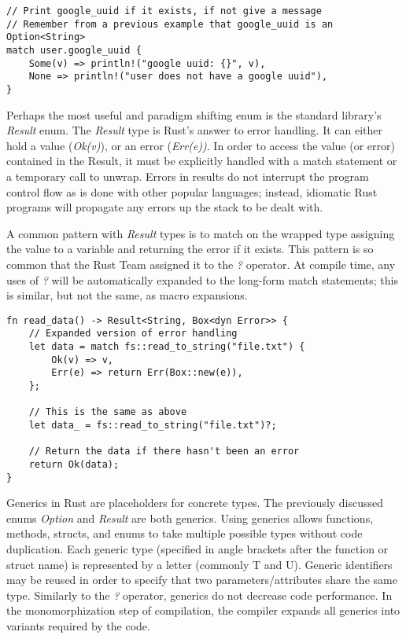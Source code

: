 \documentclass[12pt]{article}
\begin{document}
\begin{flushleft}
\singlespacing{}
\begin{verbatim}
// Print google_uuid if it exists, if not give a message
// Remember from a previous example that google_uuid is an Option<String>
match user.google_uuid {
    Some(v) => println!("google uuid: {}", v),
    None => println!("user does not have a google uuid"),
}
\end{verbatim}
\doublespacing{}

Perhaps the most useful and paradigm shifting enum is the standard library's
\textit{Result} enum. The \textit{Result} type is Rust's answer to error
handling. It can either hold a value (\textit{Ok(v)}), or an error
(\textit{Err(e))}. In order to access the value (or error) contained in the
Result, it must be explicitly handled with a match statement or a temporary call
to unwrap. Errors in results do not interrupt the program control flow as is
done with other popular languages; instead, idiomatic Rust programs will propagate
any errors up the stack to be dealt with.

A common pattern with \textit{Result} types is to match on the wrapped type
assigning the value to a variable and returning the error if it exists. This
pattern is so common that the Rust Team assigned it to the \textit{?} operator.
At compile time, any uses of \textit{?} will be automatically expanded to the
long-form match statements; this is similar, but not the same, as macro
expansions.

\singlespacing{}
\begin{verbatim}
fn read_data() -> Result<String, Box<dyn Error>> {
    // Expanded version of error handling
    let data = match fs::read_to_string("file.txt") {
        Ok(v) => v,
        Err(e) => return Err(Box::new(e)),
    };

    // This is the same as above
    let data_ = fs::read_to_string("file.txt")?;

    // Return the data if there hasn't been an error
    return Ok(data);
}
\end{verbatim}
\doublespacing{}

Generics in Rust are placeholders for concrete types. The previously discussed
enums \textit{Option} and \textit{Result} are both generics. Using generics
allows functions, methods, structs, and enums to take multiple possible types
without code duplication. Each generic type (specified in angle brackets after
the function or struct name) is represented by a letter (commonly T and U).
Generic identifiers may be reused in order to specify that two
parameters/attributes share the same type. Similarly to the \textit{?}
operator, generics do not decrease code performance. In the monomorphization
step of compilation, the compiler expands all generics into variants required
by the code.


\end{flushleft}
\end{document}

